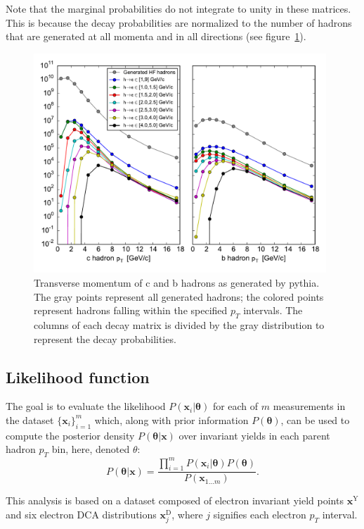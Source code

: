 \documentclass[12pt]{article}
\newcommand{\xvec}{\mathbf{x}}
\newcommand{\thetavec}{\mathbf{\theta}}
\newcommand{\prior}{P(\thetavec)}
\newcommand{\post}{P(\thetavec|\xvec)}
\newcommand{\ilike}{P(\xvec_i|\thetavec)}
\newcommand{\data}{\{\xvec_i\}_{i=1}^m}
\newcommand{\eptdata}{\xvec^{\mathrm{Y}}}
\newcommand{\dcadata}{\xvec^{\mathrm{D}}_j}
\begin{document}
Note that the marginal probabilities do not integrate to unity in these matrices. This is because the decay probabilities are normalized to the number of hadrons that are generated at all momenta and in all directions (see figure~\ref{fig:gen}).
\begin{figure}[tb]
  \begin{center}
    \includegraphics[width=0.98\textwidth]{hpt-gen}
  \end{center}
  \caption{Transverse momentum of c and b hadrons as generated by pythia. The gray points represent all generated hadrons; the colored points represent hadrons falling within the specified $p_T$ intervals. The columns of each decay matrix is divided by the gray distribution to represent the decay probabilities.}
  \label{fig:gen}
\end{figure}


\subsection{Likelihood function}
The goal is to evaluate the likelihood $\ilike$ for each of $m$ measurements in the dataset $\data$ which, along with prior information $\prior$, can be used to compute the posterior density $\post$ over invariant yields in each parent hadron $p_T$ bin, here, denoted $\theta$:
\begin{equation}\label{eq:bayesrule}
  \post = \frac{\prod_{i=1}^m \ilike \prior}{P(\xvec_{1\ldots m})}.
\end{equation}

This analysis is based on a dataset composed of electron invariant yield points $\eptdata$ and six electron DCA distributions $\dcadata$, where $j$ signifies each electron $p_T$ interval.
\end{document}
